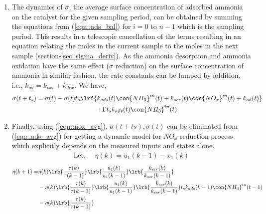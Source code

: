 \begin{enumerate}
        \item The dynamics of $\sigma$, the average surface concentration of adsorbed ammonia on the catalyst for the
                given sampling period, can be obtained by summing the equations from (\ref{eqn::ads_bal}) for $i = 0$ to
                $n-1$ which is the sampling period. This results in a telescopic cancellation of the terms resulting in
                an equation relating the moles in the current sample to the moles in the next sample
                (section-\ref{sec::sigma_deriv}). As the ammonia desorption and ammonia oxidation have the same effect
                ($\sigma$ reduction) on the surface concentration of ammonia in similar fashion, the rate constants can
                be lumped by addition, i.e., $k_{od} = k_{oxi} + k_{dex}$. We have,
                \begin{multline}
                        \sigma(t + t_s) = \sigma(t) - \sigma(t) t_s \lrf{k_{ads}(t) \con{NH_3}^{in}(t)
                                                                                + k_{scr}(t) \con{NO_x}^{in}(t)
                                                                                + k_{od}(t)}
                                                \\
                                                + \Gamma t_s k_{ads}(t) \con{NH_3}^{in}(t)
                        \label{eqn::ads_avg}
                \end{multline}
        \item Finally, using (\ref{eqn::nox_avg}), $\sigma(t+ts), \sigma(t)$ can be eliminated from (\ref{eqn::ads_avg}) for getting a dynamic model for $NO_x$-reduction process which explicitly depends on the measured inputs and states alone.
                \begin{align}
                        \text{Let, }\quad \eta(k) = u_1(k-1) - x_1(k)
                \end{align}
\begin{align*}
        \eta(k+1) =& \eta(k) \lrb{\frac{\tau(k)}{\tau(k-1)}}
                                \lrb{\frac{u_1(k)}{u_1(k-1)}}
                                \lrb{\frac{k_{scr}(k)}{k_{scr}(k-1)}} \\
                &-\eta(k) \lrb{\frac{\tau(k)}{\tau(k-1)}}
                                \lrb{\frac{u_1(k)}{u_1(k-1)}}
                                \lrb{\frac{k_{scr}(k)}{k_{scr}(k-1)}}
                t_s k_{ads}(k-1) \con{NH_3}^{in}(t-1)
                \\
                &-\eta(k) \lrb{\frac{\tau(k)}{\tau(k-1)}}

\end{align*}
\end{enumerate}
